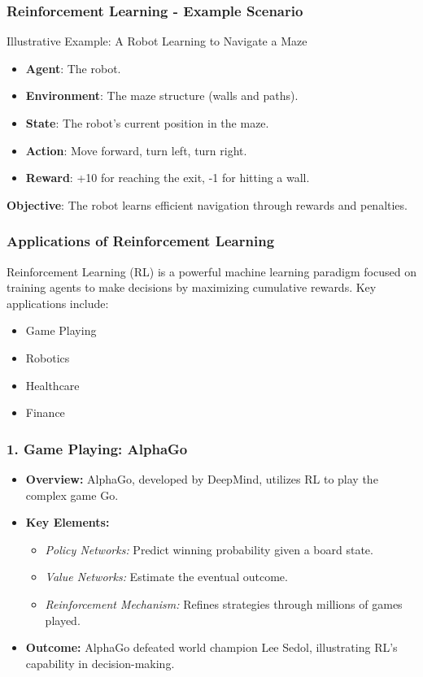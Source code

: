 \documentclass{beamer}
\begin{document}
\begin{frame}[fragile]
    \frametitle{Reinforcement Learning - Example Scenario}
    \begin{block}{Illustrative Example: A Robot Learning to Navigate a Maze}
        \begin{itemize}
            \item \textbf{Agent}: The robot.
            \item \textbf{Environment}: The maze structure (walls and paths).
            \item \textbf{State}: The robot's current position in the maze.
            \item \textbf{Action}: Move forward, turn left, turn right.
            \item \textbf{Reward}: +10 for reaching the exit, -1 for hitting a wall.
        \end{itemize}
        \textbf{Objective}: The robot learns efficient navigation through rewards and penalties.
    \end{block}
\end{frame}

\begin{frame}[fragile]
    \frametitle{Applications of Reinforcement Learning}
    Reinforcement Learning (RL) is a powerful machine learning paradigm focused on training agents to make decisions by maximizing cumulative rewards. Key applications include:
    \begin{itemize}
        \item Game Playing
        \item Robotics
        \item Healthcare
        \item Finance
    \end{itemize}
\end{frame}

\begin{frame}[fragile]
    \frametitle{1. Game Playing: AlphaGo}
    \begin{itemize}
        \item \textbf{Overview:} AlphaGo, developed by DeepMind, utilizes RL to play the complex game Go.
        \item \textbf{Key Elements:}
        \begin{itemize}
            \item \textit{Policy Networks:} Predict winning probability given a board state.
            \item \textit{Value Networks:} Estimate the eventual outcome.
            \item \textit{Reinforcement Mechanism:} Refines strategies through millions of games played.
        \end{itemize}
        \item \textbf{Outcome:} AlphaGo defeated world champion Lee Sedol, illustrating RL's capability in decision-making.
    \end{itemize}
\end{frame}
\end{document}
